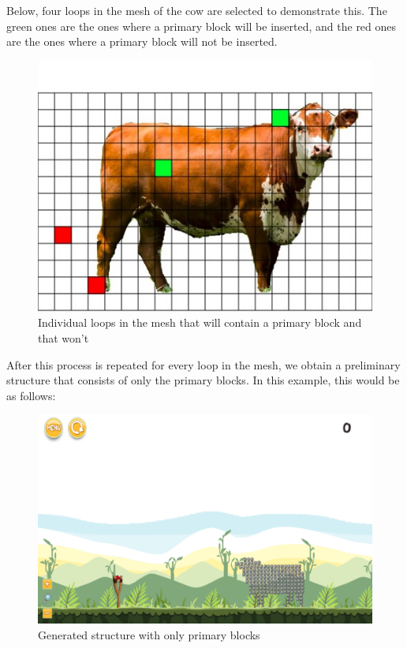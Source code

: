 \documentclass{dalthesis}
\begin{document}
Below, four loops in the mesh of the cow are selected to demonstrate this. The green ones are the ones where a primary block will be inserted, and the red ones are the ones where a primary block will not be inserted.

\begin{figure}[H]
	\caption{Individual loops in the mesh that will contain a primary block and that won't}
  \includegraphics[width=\textwidth,height=\textheight,keepaspectratio]{process/cow-meshed-marked.jpg}
\end{figure}

After this process is repeated for every loop in the mesh, we obtain a preliminary structure that consists of only the primary blocks. In this example, this would be as follows:

\begin{figure}[H]
	\caption{Generated structure with only primary blocks}
  \includegraphics[width=\textwidth,height=\textheight,keepaspectratio]{process/cow-only_primary_blocks.png}
\end{figure}
\end{document}
